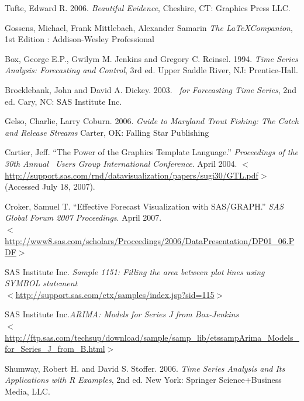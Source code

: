\documentclass[10pt]{sugconf-ish}
\begin{document}
\begin{list}{}{\setlength{\leftmargin}{2em}\setlength{\itemindent}{0em}\raggedright}
\item Tufte, Edward R. 2006. 
\emph{Beautiful Evidence},  Cheshire, CT: Graphics Press LLC.

\item Gossens, Michael, Frank Mittlebach, Alexander Samarin \emph{The \LaTeX Companion}, 1st Edition : Addison-Wesley Professional

\item Box, George E.P., Gwilym M. Jenkins and Gregory C. Reinsel. 1994. 
\emph{Time Series Analysis: Forecasting and Control}, 3rd ed. Upper Saddle River, NJ: Prentice-Hall.

\item Brocklebank, John and David A. Dickey. 2003. 
\emph{\SASregistered\ for Forecasting Time Series}, 2nd ed. Cary, NC: SAS Institute Inc.

\item Gelso, Charlie, Larry Coburn. 2006. \emph{Guide to Maryland Trout Fishing:  The Catch and Release Streams} Carter, OK: Falling Star Publishing

\item Cartier, Jeff. ``The Power of the Graphics Template Language.'' \emph{Proceedings of the 30th Annual \SASregistered\ Users Group International Conference}. April 2004. %
$<$\url{http://support.sas.com/rnd/datavisualization/papers/sugi30/GTL.pdf}$>$ (Accessed July 18, 2007).

\item Croker, Samuel T. ``Effective Forecast Visualization with SAS/GRAPH.'' \emph{SAS Global Forum 2007 Proceedings}. April 2007. \\ $<$\url{http://www8.sas.com/scholars/Proceedings/2006/DataPresentation/DP01_06.PDF}$>$

\item SAS Institute Inc.\emph{ Sample 1151: Filling the area between plot lines using SYMBOL statement} \\ $<$\url{http://support.sas.com/ctx/samples/index.jsp?sid=115}$>$

\item SAS Institute Inc.\emph{ARIMA: Models for Series J from Box-Jenkins}\\$<$\url{http://ftp.sas.com/techsup/download/sample/samp_lib/etssampArima_Models_for_Series_J_from_B.html}$>$


\item Shumway, Robert H. and David S. Stoffer. 2006. 
\emph{Time Series Analysis and Its Applications with R Examples}, 2nd ed. New York: Springer Science+Business Media, LLC.
\end{list}
\end{document}
